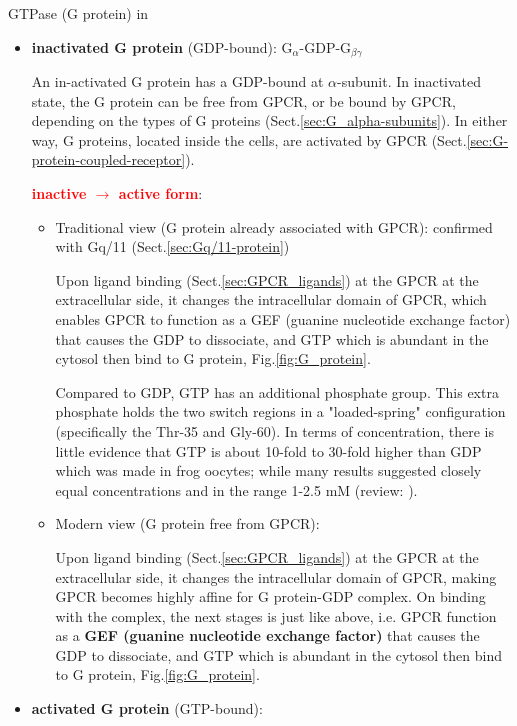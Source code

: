 GTPase (G protein) in
\begin{itemize}
  \item {\bf inactivated G protein} (GDP-bound):
  G$_\alpha$-GDP-G$_{\beta\gamma}$

An in-activated G protein has a GDP-bound at $\alpha$-subunit.
In inactivated state, the G protein can be free from GPCR, or be bound by GPCR,
depending on the types of G proteins (Sect.\ref{sec:G_alpha-subunits}).
In either way, G proteins, located inside the cells, are activated by GPCR
(Sect.\ref{sec:G-protein-coupled-receptor}).

\textcolor{red}{\bf inactive $\rightarrow$ active form}:
\begin{itemize}
  \item Traditional view (G protein already associated with GPCR):
  confirmed with Gq/11 (Sect.\ref{sec:Gq/11-protein})
  
Upon ligand binding (Sect.\ref{sec:GPCR_ligands}) at the GPCR at the
extracellular side, it changes the intracellular domain of GPCR, which enables
GPCR to function as a GEF (guanine nucleotide exchange factor) that causes the
GDP to dissociate, and GTP which is abundant in the cytosol then bind to G
protein, Fig.\ref{fig:G_protein}.

Compared to GDP, GTP has an additional phosphate group.
This extra phosphate holds the two switch regions in a "loaded-spring"
configuration (specifically the Thr-35 and Gly-60).
In terms of concentration, there is little evidence that GTP is about 10-fold
to 30-fold higher than GDP which was made in frog oocytes; while many results
suggested closely equal concentrations and in the range 1-2.5 mM (review:
\citep{nelson2008_GTP-GDP}).
 

  \item Modern view (G protein free from GPCR):
  
Upon ligand binding (Sect.\ref{sec:GPCR_ligands}) at the GPCR at the
extracellular side, it changes the intracellular domain of GPCR, 
making GPCR becomes highly affine for G protein-GDP complex. 
On binding with the complex, the next stages is just like above, i.e.
GPCR function as a {\bf GEF (guanine nucleotide exchange factor)} that causes
the GDP to dissociate, and GTP which is abundant in the cytosol then bind to G
protein, Fig.\ref{fig:G_protein}.
  
\end{itemize}  


  \item {\bf activated G protein} (GTP-bound):


\end{itemize}

